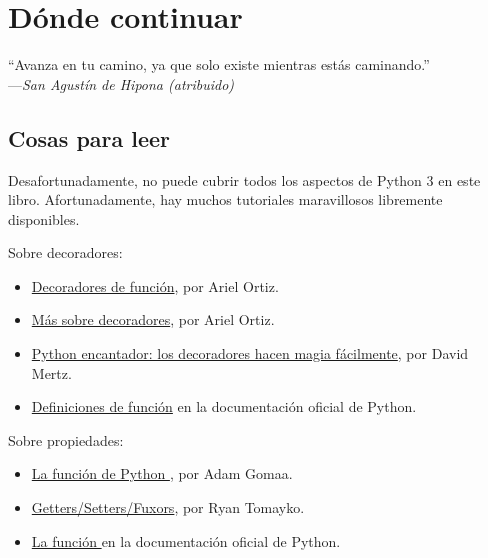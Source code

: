 
\chapter{Dónde continuar}



\begin{citaCap}
    ``Avanza en tu camino, ya que solo existe mientras estás caminando.'' \\
        ---\emph{San Agustín de Hipona (atribuido)}
\end{citaCap}

\section{Cosas para leer}

Desafortunadamente, no puede cubrir todos los aspectos de Python 3 en este libro. Afortunadamente, hay muchos tutoriales maravillosos libremente disponibles.

Sobre decoradores:

\begin{itemize}
  \item \href{http://programmingbits.pythonblogs.com/27\_programmingbits/archive/50\_function\_decorators.html}{Decoradores de función}, por Ariel Ortiz.
  \item \href{http://programmingbits.pythonblogs.com/27\_programmingbits/archive/51\_more\_on\_function\_decorators.html}{Más sobre decoradores}, por Ariel Ortiz.
  \item \href{http://www.ibm.com/developerworks/linux/library/l-cpdecor.html}{Python encantador: los decoradores hacen magia fácilmente}, por David Mertz.
  \item \href{http://docs.python.org/reference/compound\_stmts.html\#function}{Definiciones de función} en la documentación oficial de Python.
\end{itemize}

Sobre propiedades:

\begin{itemize}
  \item \href{http://adam.gomaa.us/blog/2008/aug/11/the-python-property-builtin/}{La función de Python }, por Adam Gomaa.
  \item \href{http://tomayko.com/writings/getters-setters-fuxors}{Getters/Setters/Fuxors}, por Ryan Tomayko.
  \item \href{http://docs.python.org/library/functions.html#property}{La función } en la documentación oficial de Python.
\end{itemize}


